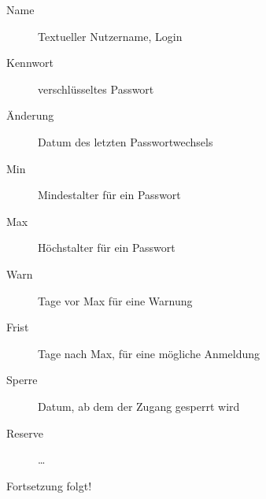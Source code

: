 \documentclass[aspectratio=43]{beamer}
\begin{document}
\begin{frame}{}
  \vspace{-2em}
  \begin{center}
  \hspace{-1.4em}\colorbox{yellow}{}
  \end{center}
  \begin{block}{}
    \begin{description}
      \item[Name]        Textueller Nutzername, Login
      \item[Kennwort]    verschlüsseltes Passwort
      \item[Änderung]    Datum des letzten Passwortwechsels
      \item[Min]	 Mindestalter für ein Passwort
      \item[Max]	 Höchstalter für ein Passwort
      \item[Warn]	 Tage vor Max für eine Warnung
      \item[Frist]	Tage nach Max, für eine mögliche Anmeldung
      \item[Sperre]	Datum, ab dem der Zugang gesperrt wird
      \item[Reserve]	\dots
    \end{description}
  \end{block}
\end{frame}

\begin{frame}
  \begin{center}
    \Huge Fortsetzung folgt!
  \end{center}
\end{frame}
\end{document}
